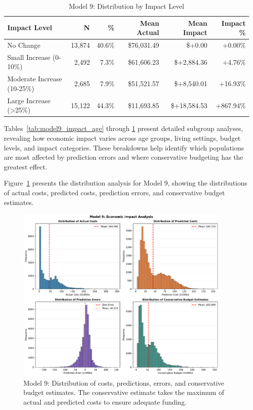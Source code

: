 \begin{table}[htbp]
\centering
\small
\caption{Model 9: Distribution by Impact Level}
\label{tab:model9_impact_distribution}
\begin{tabular}{lrrrrr}
\toprule
\textbf{Impact Level} & \textbf{N} & \textbf{\%} & \textbf{Mean Actual} & \textbf{Mean Impact} & \textbf{Impact \%} \\
\midrule
No Change & 13,874 & 40.6\% & \$76,031.49 & \$+0.00 & +0.00\% \\
Small Increase (0-10\%) & 2,492 & 7.3\% & \$61,606.23 & \$+2,884.36 & +4.76\% \\
Moderate Increase (10-25\%) & 2,685 & 7.9\% & \$51,521.57 & \$+8,540.01 & +16.93\% \\
Large Increase (>25\%) & 15,122 & 44.3\% & \$11,693.85 & \$+18,584.53 & +867.94\% \\
\bottomrule
\end{tabular}
\end{table}

Tables~\ref{tab:model9_impact_age} through \ref{tab:model9_impact_distribution} present detailed subgroup analyses, revealing how economic impact varies across age groups, living settings, budget levels, and impact categories. These breakdowns help identify which populations are most affected by prediction errors and where conservative budgeting has the greatest effect.

Figure~\ref{fig:model9_impact_histograms} presents the distribution analysis for Model 9, showing the distributions of actual costs, predicted costs, prediction errors, and conservative budget estimates.

\begin{figure}[htbp]
\centering
\includegraphics[width=0.95\textwidth]{figures/model_9_Impact_Histograms.pdf}
\caption{Model 9: Distribution of costs, predictions, errors, and conservative budget estimates. The conservative estimate takes the maximum of actual and predicted costs to ensure adequate funding.}
\label{fig:model9_impact_histograms}
\end{figure}

